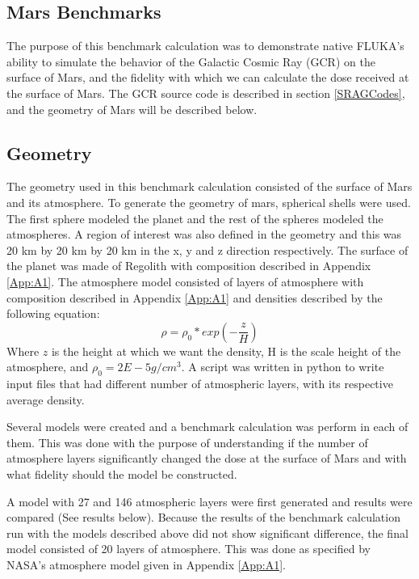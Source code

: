 
\subsection{Mars Benchmarks}

The purpose of this benchmark calculation was to demonstrate native FLUKA's ability
to simulate the behavior of the Galactic Cosmic Ray (GCR) on the surface of Mars,
and the fidelity with which we can calculate the dose received at the surface of Mars.
The GCR source code is described in section \ref{SRAGCodes}, and the geometry of
Mars will be described below.

\subsection*{Geometry}
The geometry used in this benchmark calculation consisted of the surface of Mars and
its atmosphere. To generate the geometry of mars, spherical shells were used.
The first sphere modeled the planet and the rest of the spheres modeled the atmospheres.
A region of interest was also defined in the geometry and this was 20 km by 20 km
by 20 km in the x, y and z direction respectively.
The surface of the planet was made of Regolith with composition described in
Appendix \ref{App:A1}.
The atmosphere model consisted of layers of atmosphere with composition described in
Appendix \ref{App:A1} and densities described by the following equation:
\begin{equation}
\label{density}
\rho = \rho_0 *exp(- \frac{z}{H})
\end{equation}
Where $z$ is the height at which we want the density, H is the scale height of the atmosphere,
and $\rho_0 = 2E-5 g/cm^3$.
A script was written in python to write input files that had different number of atmospheric
layers, with its respective average density.

Several models were created and a benchmark calculation was perform in each of them.
This was done with the purpose of understanding if the number of atmosphere layers
significantly changed the dose at the surface of Mars and with what fidelity should the model
be constructed.

A model with 27 and 146 atmospheric layers were first generated and results were compared
(See results below).  Because the results of the benchmark calculation run with the models
described above did not show significant difference, the final model consisted of 20 layers
of atmosphere. This was done as specified by NASA's atmosphere model given in Appendix \ref{App:A1}.

